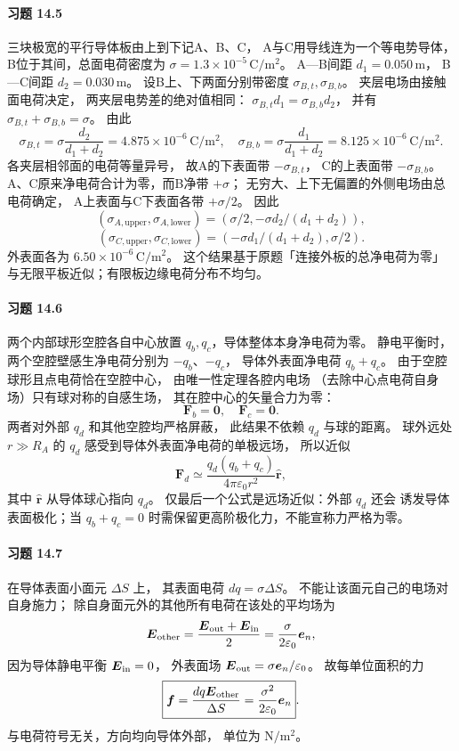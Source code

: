 \paragraph{习题 14.5}
三块极宽的平行导体板由上到下记A、B、C，
A与C用导线连为一个等电势导体，
B位于其间，总面电荷密度为
\(\sigma=1.3\times10^{-5}\,\mathrm{C/m^2}\)。
A—B间距 \(d_1=0.050\,\mathrm m\)，
B—C间距 \(d_2=0.030\,\mathrm m\)。
设B上、下两面分别带密度
\(\sigma_{B,t},\sigma_{B,b}\)。
夹层电场由接触面电荷决定，
两夹层电势差的绝对值相同：
\(\sigma_{B,t}d_1=\sigma_{B,b}d_2\)，
并有
\(\sigma_{B,t}+\sigma_{B,b}=\sigma\)。
由此
\[
 \boxed{\sigma_{B,t}=\sigma\frac{d_2}{d_1+d_2}
 =4.875\times10^{-6}\,\mathrm{C/m^2}},\quad
 \boxed{\sigma_{B,b}=\sigma\frac{d_1}{d_1+d_2}
 =8.125\times10^{-6}\,\mathrm{C/m^2}}.
\]
各夹层相邻面的电荷等量异号，
故A的下表面带 \(-\sigma_{B,t}\)，
C的上表面带 \(-\sigma_{B,b}\)。
A、C原来净电荷合计为零，而B净带 \(+\sigma\)；
无穷大、上下无偏置的外侧电场由总电荷确定，
A上表面与C下表面各带 \(+\sigma/2\)。
因此
\[
 \boxed{(\sigma_{A,\mathrm{upper}},\sigma_{A,\mathrm{lower}})
 =(\sigma/2,-\sigma d_2/(d_1+d_2))},
\]
\[
 \boxed{(\sigma_{C,\mathrm{upper}},\sigma_{C,\mathrm{lower}})
 =(-\sigma d_1/(d_1+d_2),\sigma/2)}.
\]
外表面各为 \(6.50\times10^{-6}\,\mathrm{C/m^2}\)。
这个结果基于原题「连接外板的总净电荷为零」
与无限平板近似；有限板边缘电荷分布不均匀。

\paragraph{习题 14.6}
两个内部球形空腔各自中心放置
\(q_b,q_c\)，导体整体本身净电荷为零。
静电平衡时，两个空腔壁感生净电荷分别为
\(-q_b\)、\(-q_c\)，
导体外表面净电荷 \(q_b+q_c\)。
由于空腔球形且点电荷恰在空腔中心，
由唯一性定理各腔内电场
（去除中心点电荷自身场）只有球对称的自感生场，
其在腔中心的矢量合力为零：
\[
 \boxed{\boldsymbol F_b=\boldsymbol0,\quad
 \boldsymbol F_c=\boldsymbol0}.
\]
两者对外部 \(q_d\) 和其他空腔均严格屏蔽，
此结果不依赖 \(q_d\) 与球的距离。
球外远处 \(r\gg R_A\) 的 \(q_d\)
感受到导体外表面净电荷的单极远场，
所以近似
\[
 \boxed{\boldsymbol F_d\simeq
 \frac{q_d(q_b+q_c)}{4\pi\varepsilon_0r^2}
 \hat{\boldsymbol r}},
\]
其中 \(\hat{\boldsymbol r}\) 从导体球心指向 \(q_d\)。
仅最后一个公式是远场近似：外部 \(q_d\) 还会
诱发导体表面极化；当 \(q_b+q_c=0\)
时需保留更高阶极化力，不能宣称力严格为零。

\paragraph{习题 14.7}
在导体表面小面元 \(\Delta S\) 上，
其表面电荷 \(dq=\sigma\Delta S\)。
不能让该面元自己的电场对自身施力；
除自身面元外的其他所有电荷在该处的平均场为
\[
 \boldsymbol E_{\rm other}
 =\frac{\boldsymbol E_{\rm out}
 +\boldsymbol E_{\rm in}}2
 =\frac{\sigma}{2\varepsilon_0}\boldsymbol e_n,
\]
因为导体静电平衡
\(\boldsymbol E_{\rm in}=0\)，
外表面场
\(\boldsymbol E_{\rm out}
 =\sigma\boldsymbol e_n/\varepsilon_0\)。
故每单位面积的力
\[
 \boxed{\boldsymbol f=\frac{dq\boldsymbol E_{\rm other}}
 {\Delta S}
 =\frac{\sigma^2}{2\varepsilon_0}\boldsymbol e_n}.
\]
与电荷符号无关，方向均向导体外部，
单位为 \(\mathrm{N/m^2}\)。

